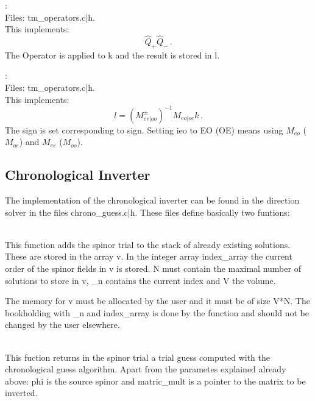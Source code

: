 :\\
Files: {\ttfamily tm\_operators.c|h}.\\
This implements:
\[
\hat Q_{+} \hat Q_{-}\, .
\]
The Operator is applied to {\ttfamily k} and the result is stored in
{\ttfamily l}.

:\\
Files:  {\ttfamily tm\_operators.c|h}.\\
This implements:
\[
l = (M_{ee|oo}^\pm)^{-1} M_{eo|oe} k\, .
\]
The sign is set corresponding to {\ttfamily sign}. Setting {\ttfamily
  ieo} to {\ttfamily EO} ({\ttfamily OE}) means using $M_{eo}$
($M_{oe}$) and $M_{ee}$ ($M_{oo}$).

\subsection{Chronological Inverter}

The implementation of the chronological inverter \cite{Brower:1995vx}
can be found in the direction {\ttfamily solver} in the files
{\ttfamily chrono\_guess.c|h}. These files define basically two
funtions:

\\
This function adds the spinor {\ttfamily trial} to the stack of
already existing solutions. These are stored in the array {\ttfamily
  v}. In the integer array {\ttfamily index\_array} the current order
of the spinor fields in {\ttfamily v} is stored. {\ttfamily N} must
contain the maximal number of solutions to store in {\ttfamily v},
{\ttfamily \_n} contains the current index and {\ttfamily V} the volume.

The memory for {\ttfamily v} must be allocated by the user and it must
be of size {\ttfamily V*N}. The bookholding with {\ttfamily \_n} and
{\ttfamily index\_array} is done by the function and should not be
changed by the user elsewhere.

\\
This fuction returns in the spinor {\ttfamily trial} a trial guess
computed with the chronological guess algorithm. Apart from the
parametes explained already above: {\ttfamily phi} is the source
spinor and {\ttfamily matric\_mult} is a pointer to the matrix to be
inverted.

